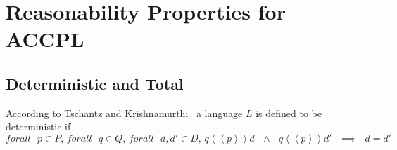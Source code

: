 \section{Reasonability Properties for ACCPL}

\subsection{Deterministic and Total}

According to Tschantz and Krishnamurthi~\cite{Tschantz} a language $L$ is defined to be deterministic if 
\begin{equation*}
 \text{$forall$ $p \in P$, $forall$ $q \in Q$, $forall$ $d, d' \in D$, $q \left\langle\left\langle p  \right\rangle\right\rangle d$ $\land$ $q \left\langle\left\langle p  \right\rangle\right\rangle d'$ $\implies$ $d = d'$}
\end{equation*}
















